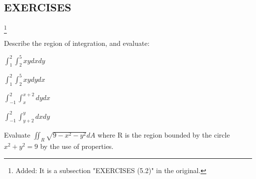 \documentclass{amsbook}
\begin{document}
\subsection {EXERCISES}\footnote{Added: It is a subsection "EXERCISES (5.2)" in the original.}
\begin{hEnumerateArabic}
    \setcounter{enumi}{25}
    \item Describe the region of integration, and evaluate:
        \begin{hEnumerateAlpha}
            \begin{multicols}{2}
                \item \(\int_{1}^{2} \int_{2}^{5} xy dx dy \)
                \columnbreak
                \item \(\int_{1}^{2} \int_{2}^{5} xy dy dx \)       
            \end{multicols}
            \begin{multicols}{2}
                \item \(\int_{-1}^{2} \int_{x}^{x+2} dy dx \)
                \columnbreak
                \item \(\int_{-1}^{2} \int_{y+2}^{y} dx dy \)
            \end{multicols}
        \end{hEnumerateAlpha}
    \item Evaluate \( \iint_{R} \sqrt{9 - x^2 - y^2} dA \)
        where R is the region bounded by the circle \( x^2 + y^2 = 9 \) by the use of properties.
\end{hEnumerateArabic}
\end{document}
